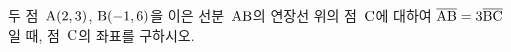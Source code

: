 두 점~$\mathrm{A}(2{,}\mkern3mu\mathopen{}3)$, $\mathrm{B}(-1{,}\mkern3mu\mathopen{}6)$을 이은 선분~$\mathrm{AB}$의 연장선 위의 점~$\mathrm{C}$에 대하여 $\overline{\mathrm{AB}}=3\overline{\mathrm{BC}}$일 때, 점~$\mathrm{C}$의 좌표를 구하시오.
